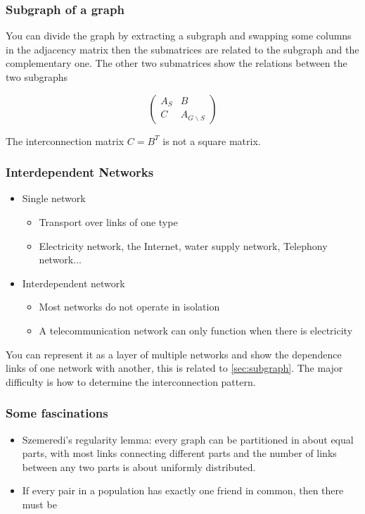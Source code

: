 \subsubsection{Subgraph of a graph \label{sec:subgraph}}

You can divide the graph by extracting a subgraph and swapping some columns in the adjacency matrix
then the submatrices are related to the subgraph and the complementary one. The other two 
submatrices show the relations between the two subgraphs

$$
\begin{pmatrix}
  A_S & B \\
  C & A_{G \backslash S}
\end{pmatrix}
$$

The interconnection matrix $C = B^T$ is not a square matrix.

\subsubsection{Interdependent Networks}
\begin{itemize}
  \item Single network
  \begin{itemize}
    \item Transport over links of one type
    \item Electricity network, the Internet, water supply network, Telephony network...
  \end{itemize}
  \item Interdependent network
  \begin{itemize}
    \item Most networks do not operate in isolation
    \item A telecommunication network can only function when there is electricity
  \end{itemize}
\end{itemize}

You can represent it as a layer of multiple networks and show the dependence links of one network
with another, this is related to \autoref{sec:subgraph}. The major difficulty is how to determine
the interconnection pattern.

\subsubsection{Some fascinations}
\begin{itemize}
  \item Szemeredi's regularity lemma: every graph can be partitioned in about equal parts,
  with most links connecting different parts and the number of links between any two parts is about
  uniformly distributed.
  \item If every pair in a population has exactly one friend in common, then there must be
\end{itemize}






